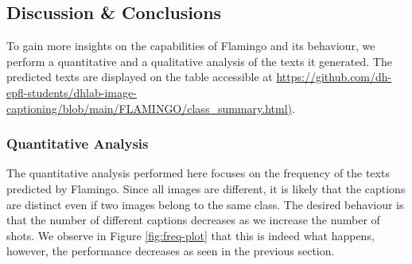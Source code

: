 



\subsection{Discussion \& Conclusions}
To gain more insights on the capabilities of Flamingo and its behaviour, we perform a quantitative and a qualitative analysis of the texts it generated. The predicted texts are displayed on the table accessible at \url{https://github.com/dh-epfl-students/dhlab-image-captioning/blob/main/FLAMINGO/class_summary.html)}.

\subsubsection{Quantitative Analysis}

The quantitative analysis performed here focuses on the frequency of the texts predicted by Flamingo. Since all images are different, it is likely that the captions are distinct even if two images belong to the same class. The desired behaviour is that the number of different captions decreases as we increase the number of shots. We observe in Figure \ref{fig:freq-plot} that this is indeed what happens, however, the performance decreases as seen in the previous section.

